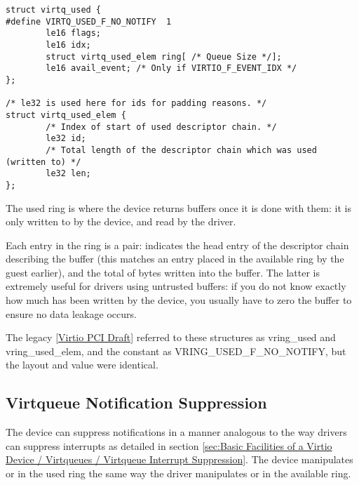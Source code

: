 \begin{lstlisting}
struct virtq_used {
#define VIRTQ_USED_F_NO_NOTIFY  1
        le16 flags;
        le16 idx;
        struct virtq_used_elem ring[ /* Queue Size */];
        le16 avail_event; /* Only if VIRTIO_F_EVENT_IDX */
};

/* le32 is used here for ids for padding reasons. */
struct virtq_used_elem {
        /* Index of start of used descriptor chain. */
        le32 id;
        /* Total length of the descriptor chain which was used (written to) */
        le32 len;
};
\end{lstlisting}

The used ring is where the device returns buffers once it is done with
them: it is only written to by the device, and read by the driver.

Each entry in the ring is a pair:  indicates the head entry of the
descriptor chain describing the buffer (this matches an entry
placed in the available ring by the guest earlier), and  the total
of bytes written into the buffer. The latter is extremely useful
for drivers using untrusted buffers: if you do not know exactly
how much has been written by the device, you usually have to zero
the buffer to ensure no data leakage occurs.

\begin{note}
The legacy \hyperref[intro:Virtio PCI Draft]{[Virtio PCI Draft]}
referred to these structures as vring_used and vring_used_elem, and
the constant as VRING_USED_F_NO_NOTIFY, but the layout and value were
identical.
\end{note}

\subsection{Virtqueue Notification Suppression}\label{sec:Basic Facilities of a Virtio Device / Virtqueues / Virtqueue Notification Suppression}

The device can suppress notifications in a manner analogous to the way
drivers can suppress interrupts as detailed in section \ref{sec:Basic Facilities of a Virtio Device / Virtqueues / Virtqueue Interrupt Suppression}.
The device manipulates  or  in the used ring the
same way the driver manipulates  or  in the available ring.


